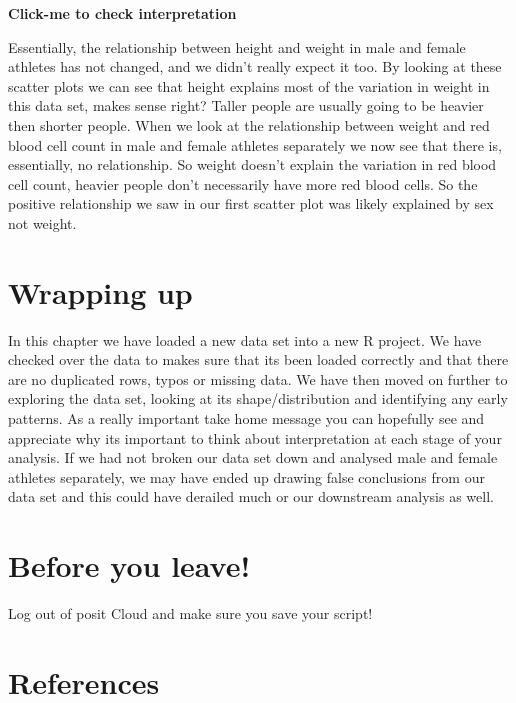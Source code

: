 \documentclass[
]{book}
\begin{document}
\textbf{Click-me to check interpretation}

Essentially, the relationship between height and weight in male and female athletes has not changed, and we didn't really expect it too. By looking at these scatter plots we can see that height explains most of the variation in weight in this data set, makes sense right? Taller people are usually going to be heavier then shorter people. When we look at the relationship between weight and red blood cell count in male and female athletes separately we now see that there is, essentially, no relationship. So weight doesn't explain the variation in red blood cell count, heavier people don't necessarily have more red blood cells. So the positive relationship we saw in our first scatter plot was likely explained by sex not weight.

\hypertarget{wrapping-up}{%
\section{Wrapping up}\label{wrapping-up}}

In this chapter we have loaded a new data set into a new R project. We have checked over the data to makes sure that its been loaded correctly and that there are no duplicated rows, typos or missing data. We have then moved on further to exploring the data set, looking at its shape/distribution and identifying any early patterns. As a really important take home message you can hopefully see and appreciate why its important to think about interpretation at each stage of your analysis. If we had not broken our data set down and analysed male and female athletes separately, we may have ended up drawing false conclusions from our data set and this could have derailed much or our downstream analysis as well.

\hypertarget{before-you-leave-7}{%
\section{Before you leave!}\label{before-you-leave-7}}

Log out of posit Cloud and make sure you save your script!

\hypertarget{references-8}{%
\section{References}\label{references-8}}
\end{document}
